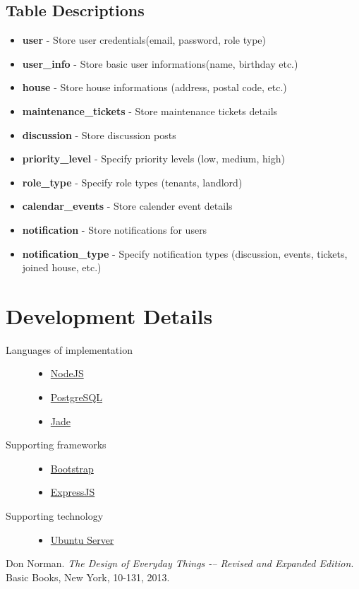 \documentclass[12pt]{article}
\begin{document}
\subsection{Table Descriptions}
\begin{itemize}
    \item \textbf{user} - Store user credentials(email, password, role type)
    \item \textbf{user\_info} - Store basic user informations(name, birthday etc.)
    \item \textbf{house} - Store house informations (address, postal code, etc.)
    \item \textbf{maintenance\_tickets} - Store maintenance tickets details
    \item \textbf{discussion} - Store discussion posts
    \item \textbf{priority\_level} - Specify priority levels (low, medium, high)
    \item \textbf{role\_type} - Specify role types (tenants, landlord)
    \item \textbf{calendar\_events} - Store calender event details
    \item \textbf{notification} - Store notifications for users
    \item \textbf{notification\_type} - Specify notification types (discussion, events, tickets, joined house, etc.)

\end{itemize}

%
\section{Development Details}
\begin{description}
  \item[Languages of implementation] \hfill
    \begin{itemize}
      \item \href{https://nodejs.org/en/}{NodeJS}
      \item \href{http://www.postgresql.org/}{PostgreSQL}
      \item \href{http://jade-lang.com/}{Jade}
    \end{itemize}
  \item[Supporting frameworks] \hfill
    \begin{itemize}
      \item \href{http://getbootstrap.com/}{Bootstrap}
      \item \href{http://expressjs.com/}{ExpressJS}
    \end{itemize}
  \item[Supporting technology] \hfill
    \begin{itemize}
      \item \href{http://www.ubuntu.com/server}{Ubuntu Server}
    \end{itemize}
\end{description}

\begin{thebibliography}{9}
Don Norman.
\textit{The Design of Everyday Things -– Revised and Expanded Edition}.
Basic Books, New York, 10-131, 2013.
\end{thebibliography}
\end{document}
